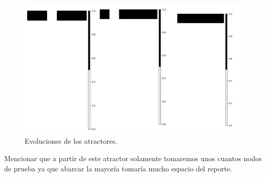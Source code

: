 \documentclass[11pt]{article}
\begin{document}
\begin{figure}[H]
			\includegraphics[scale=0.3]{resources/Atractores22/atractor_22_size_6_res9.png}
			\caption{Evoluciones de los atractores.}\label{fig:picture}
			\end{figure}
			Mencionar que a partir de este atractor solamente tomaremos unos cuantos nodos de prueba ya que abarcar la mayoría tomaría mucho espacio del reporte.
\end{document}

